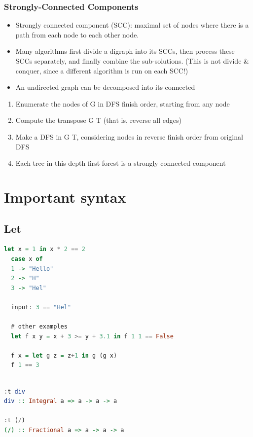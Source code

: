 \newpage

\subsubsection{Strongly-Connected Components}
\begin{itemize}
\item Strongly connected component (SCC): maximal set of nodes
  where there is a path from each node to each other node.
\item Many algorithms first divide a digraph into its SCCs, then process
  these SCCs separately, and finally combine the sub-solutions.
  (This is not divide \& conquer, since a different algorithm is run on each SCC!)
\item An undirected graph can be decomposed into its connected
\end{itemize}

\begin{enumerate}
\item Enumerate the nodes of G in DFS finish order, starting from any node
\item Compute the transpose G T (that is, reverse all edges)
\item Make a DFS in G T, considering nodes in reverse finish order from
  original DFS
\item Each tree in this depth-first forest is a strongly connected component
\end{enumerate}


\newpage

\section{Important syntax}
\subsection{Let}
\begin{lstlisting}[language=Haskell]
  let x = 1 in x * 2 == 2
  case x of
  1 -> "Hello"
  2 -> "H"
  3 -> "Hel"

  input: 3 == "Hel"
  
  # other examples
  let f x y = x + 3 >= y + 3.1 in f 1 1 == False

  f x = let g z = z+1 in g (g x)
  f 1 == 3
  
\end{lstlisting}
\begin{lstlisting}[language=Haskell]
:t div
div :: Integral a => a -> a -> a
  
:t (/)
(/) :: Fractional a => a -> a -> a
\end{lstlisting}


